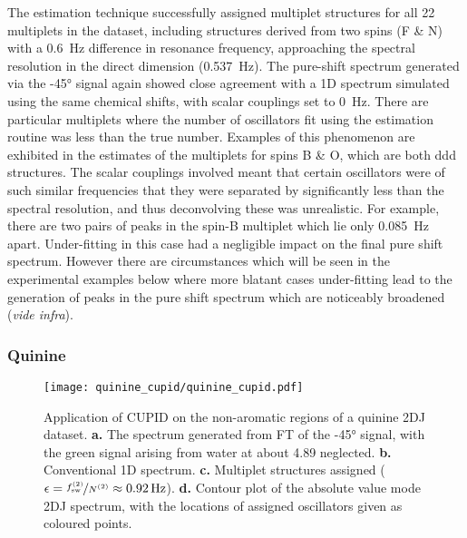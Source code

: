The estimation technique successfully assigned multiplet structures for all 22
multiplets in the dataset, including structures derived from two spins (F \& N)
with a \qty{0.6}{\hertz} difference in resonance frequency, approaching the
spectral resolution in the direct dimension (\qty{0.537}{\hertz}). The
pure-shift spectrum generated via the \ang{-45} signal again showed close
agreement with a 1D spectrum simulated using the same chemical shifts, with
scalar couplings set to \qty{0}{\hertz}. There are particular multiplets where
the number of oscillators fit using the estimation routine was less than the
true number. Examples of this phenomenon are exhibited in the estimates of the
multiplets for spins B \& O, which are both ddd structures. The scalar
couplings involved meant that certain oscillators were
of such similar frequencies that they were separated by significantly less than
the spectral resolution, and thus deconvolving these was unrealistic. For
example, there are two pairs of peaks in the spin-B multiplet which lie only
\qty{0.085}{\hertz} apart. Under-fitting in this case had a negligible impact
on the final pure shift spectrum. However there are circumstances which will be
seen in the experimental examples below where more blatant cases under-fitting
lead to the generation of peaks in the pure shift spectrum which are noticeably
broadened (\textit{vide infra}).

\subsubsection{Quinine}
\begin{figure}
    \centering
    \texttt{[image: quinine\_cupid/quinine\_cupid.pdf]}
    \caption[
        Application of \acs{CUPID} on the non-aromatic regions of a quinine
        \acs{2DJ} dataset.
    ]{
        Application of \ac{CUPID} on the non-aromatic regions of a quinine
        \ac{2DJ} dataset.
        \textbf{a.} The spectrum generated from \ac{FT} of the \ang{-45}
        signal, with the green signal arising from water at about
        \qty{4.89}{\partspermillion} neglected.
        \textbf{b.} Conventional \ac{1D} spectrum.
        \textbf{c.} Multiplet structures assigned ($\epsilon =
        \nicefrac{f_{\mathrm{sw}}^{(2)}}{N^{(2)}} \approx \qty{0.92}{\hertz}$).
        \textbf{d.} Contour plot of the absolute value mode \ac{2DJ} spectrum,
        with the locations of assigned oscillators given as coloured points.
    }
    \label{fig:quinine-cupid}
\end{figure}


